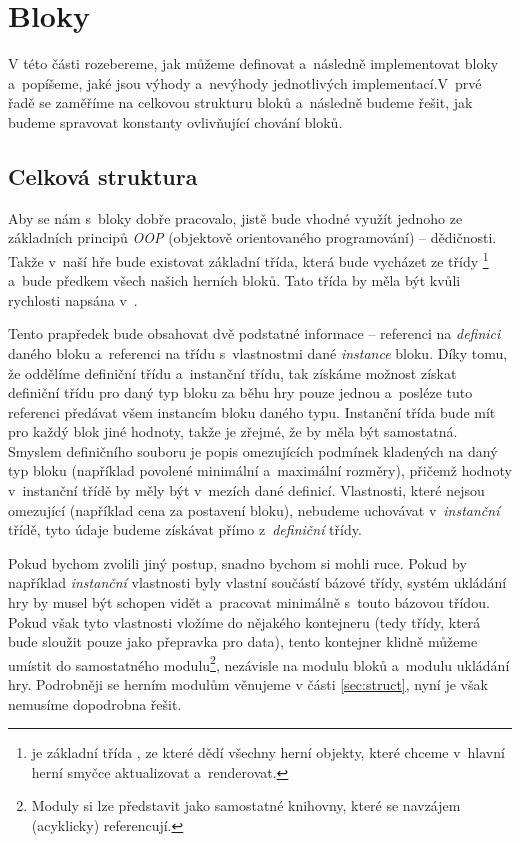 
\section{Bloky}

V této části rozebereme, jak můžeme definovat a~následně implementovat bloky a~popíšeme, jaké jsou výhody a~nevýhody jednotlivých implementací.\linebreak V~prvé řadě se zaměříme na celkovou strukturu bloků a~následně budeme řešit, jak budeme spravovat konstanty ovlivňující chování bloků.

\subsection{Celková struktura}

Aby se nám s~bloky dobře pracovalo, jistě bude vhodné využít jednoho ze základních principů \textit{OOP} (objektově orientovaného programování) -- dědičnosti. Takže v~naší hře bude existovat základní třída, která bude vycházet ze třídy \footnote{ je základní třída \UEu{}, ze které dědí všechny herní objekty, které chceme v~hlavní herní smyčce aktualizovat a~renderovat.} a~bude předkem všech našich herních bloků. Tato třída by měla být kvůli rychlosti napsána v~\CPP{}.

Tento prapředek bude obsahovat dvě podstatné informace -- referenci na \textit{definici} daného bloku a~referenci na třídu s~vlastnostmi dané \textit{instance} bloku. Díky tomu, že oddělíme definiční třídu a~instanční třídu, tak získáme možnost získat definiční třídu pro daný typ bloku za běhu hry pouze jednou a~posléze tuto referenci předávat všem instancím bloku daného typu. Instanční třída bude mít pro každý blok jiné hodnoty, takže je zřejmé, že by měla být samostatná. Smyslem definičního souboru je popis omezujících podmínek kladených na daný typ bloku (například povolené minimální a~maximální rozměry), přičemž hodnoty v~instanční třídě by měly být v~mezích dané definicí. Vlastnosti, které nejsou omezující (například cena za postavení bloku), nebudeme uchovávat v~\textit{instanční} třídě, tyto údaje budeme získávat přímo z~\textit{definiční} třídy.

Pokud bychom zvolili jiný postup, snadno bychom si mohli  ruce. Pokud by například \textit{instanční} vlastnosti byly vlastní součástí bázové třídy, systém ukládání hry by musel být schopen vidět a~pracovat minimálně s~touto bázovou třídou. Pokud však tyto vlastnosti vložíme do nějakého kontejneru (tedy třídy, která bude sloužit pouze jako přepravka pro data), tento kontejner klidně můžeme umístit do samostatného modulu\footnote{Moduly si lze představit jako samostatné knihovny, které se navzájem (acyklicky) referencují.}, nezávisle na modulu bloků a~modulu ukládání hry.  Podrobněji se herním modulům věnujeme v části \ref{sec:struct}, nyní je však nemusíme dopodrobna řešit.

